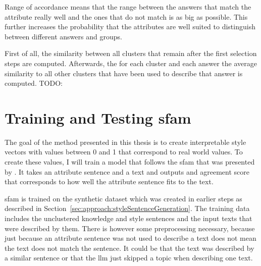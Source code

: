 Range of accordance means that the range between the answers that match the attribute really well and the ones that do not match is as big as possible. This further increases the probability that the attributes are well suited to distinguish between different answers and groups.

First of all, the similarity between all clusters that remain after the first selection steps are computed. Afterwards, the for each cluster and each answer the average similarity to all other clusters that have been used to describe that answer is computed. TODO:




\section{Training and Testing \acs{sfam}}
\label{sec:approach:sfam}

The goal of the method presented in this thesis is to create interpretable style vectors with values between \num{0} and \num{1} that correspond to real world values. To create these values, I will train a model that follows the \acf{sfam} that was presented by \citet{patelLearningInterpretableStyle2023}. It takes an attribute sentence and a text and outputs and agreement score that corresponds to how well the attribute sentence fits to the text.

\ac{sfam} is trained on the synthetic dataset which was created in earlier steps as described in Section~\ref{sec:approach:styleSentenceGeneration}. The training data includes the unclustered knowledge and style sentences and the input texts that were described by them. There is however some preprocessing necessary, because just because an attribute sentence was not used to describe a text does not mean the text does not match the sentence. It could be that the text was described by a similar sentence or that the \ac{llm} just skipped a topic when describing one text.

